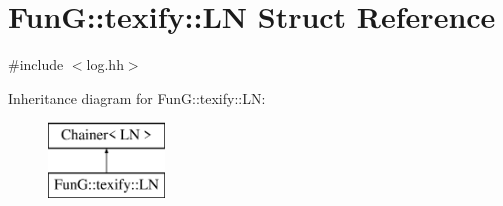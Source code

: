 \hypertarget{structFunG_1_1texify_1_1LN}{\section{Fun\-G\-:\-:texify\-:\-:L\-N Struct Reference}
\label{structFunG_1_1texify_1_1LN}
}


{\ttfamily \#include $<$log.\-hh$>$}

Inheritance diagram for Fun\-G\-:\-:texify\-:\-:L\-N\-:\begin{figure}[H]
\begin{center}
\leavevmode
\includegraphics[height=2.000000cm]{structFunG_1_1texify_1_1LN}
\end{center}
\end{figure}
